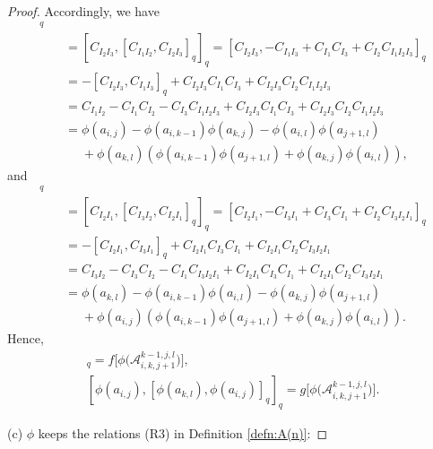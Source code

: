\documentclass[pdftex]{sigma}
\numberwithin{equation}{section}
\def\lr#1{\left[#1\right]}
\def\lrb#1{\left(#1\right)}
\def\A{\mathscr{A}}
\begin{document}
\begin{proof}
Accordingly, we have
 \begin{gather*}
 [\phi(a_{k, l}), {\lr{\phi(a_{i, j}), \phi(a_{k, l})}}_q]_q\\
 \qquad=[ C_{I_{2}I_3}, \lr{ C_{I_{1}I_2} , C_{I_{2}I_3}}_q ]_q
 =\lr{ C_{I_{2}I_3}, -C_{I_1I_3}+C_{I_1}C_{I_3}+C_{I_2}C_{I_1I_2I_3} }_q\\
\qquad =-\lr{ C_{I_{2}I_3}, C_{I_1I_3}}_q+C_{I_{2}I_3} C_{I_1}C_{I_3} + C_{I_{2}I_3}C_{I_2}C_{I_1I_2I_3} \\
 \qquad= C_{I_1I_2}-C_{I_1}C_{I_2}-C_{I_3}C_{I_1I_2I_3}+C_{I_{2}I_3} C_{I_1}C_{I_3} + C_{I_{2}I_3}C_{I_2}C_{I_1I_2I_3} \\
\qquad =\phi\lrb{a_{i, j}}-\phi\lrb{a_{i, k-1}}\phi\lrb{a_{k, j}}-\phi\lrb{a_{i, l}}\phi\lrb{a_{j+1, l}}\\
\phantom{ \qquad=}{} + \phi\lrb{a_{k, l}} \lrb{\phi\lrb{a_{i, k-1}}\phi\lrb{a_{j+1, l}} +\phi\lrb{ a_{k, j }} \phi\lrb{a_{i, l}}},
 \end{gather*}
and
\begin{gather*}
[\phi\lrb{a_{i, j}}, {\lr{\phi\lrb{a_{k, l}}, \phi\lrb{a_{i, j}}}}_q]_q\\
 \qquad=[ C_{I_{2}I_1}, \lr{ C_{I_{3}I_2} , C_{I_{2}I_1}}_q ]_q
 =\lr{ C_{I_{2}I_1}, -C_{I_3I_1}+C_{I_3}C_{I_1}+C_{I_2}C_{I_3I_2I_1} }_q\\
\qquad =-\lr{ C_{I_{2}I_1}, C_{I_3I_1}}_q+C_{I_{2}I_1} C_{I_3}C_{I_1} + C_{I_{2}I_1}C_{I_2}C_{I_3I_2I_1} \\
\qquad = C_{I_3I_2}-C_{I_3}C_{I_2}-C_{I_1}C_{I_3I_2I_1} +C_{I_{2}I_1} C_{I_3}C_{I_1} + C_{I_{2}I_1}C_{I_2}C_{I_3I_2I_1} \\
 \qquad=\phi\lrb{a_{k, l}}-\phi\lrb{a_{i, k-1}}\phi\lrb{a_{i, l}}-\phi\lrb{a_{k, j}}\phi\lrb{a_{j+1, l}}\\
\phantom{ \qquad=}{} + \phi\lrb{a_{i, j}}\lrb{\phi\lrb{a_{i, k-1}}\phi\lrb{a_{j+1, l}} + \phi\lrb{a_{k, j }}\phi\lrb{a_{i, l}}}.
 \end{gather*}
Hence,
\begin{gather*}
[\phi\lrb{a_{k, l}}, {\lr{\phi\lrb{a_{i, j}}, \phi\lrb{a_{k,l}}}}_q]_q=f\bigl[\phi\bigl(\A_{i,k,j+1}^{k-1,j,l}\bigr)\bigr],\\
[\phi\lrb{a_{i, j}}, {\lr{\phi\lrb{a_{k, l}}, \phi\lrb{a_{i, j}}}}_q]_q=g\bigl[\phi\bigl(\A_{i,k,j+1}^{k-1,j,l}\bigr)\bigr].
\end{gather*}

(c) $\phi$ keeps the relations (R3) in Definition \ref{defn:A(n)}:


\end{proof}
\end{document}
